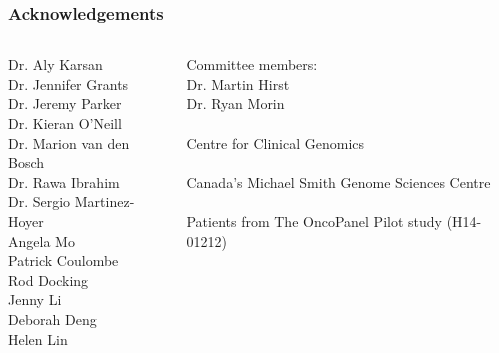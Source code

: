 \documentclass{beamer}
\begin{document}

\begin{frame}
\frametitle{Acknowledgements}
\begin{columns}[T] %
\begin{column}{.48\textwidth}
Dr. Aly Karsan \\
Dr. Jennifer Grants \\
Dr. Jeremy Parker \\
Dr. Kieran O'Neill \\
Dr. Marion van den Bosch \\
Dr. Rawa Ibrahim \\
Dr. Sergio Martinez-Hoyer \\
Angela Mo \\
Patrick Coulombe \\
Rod Docking \\
Jenny Li \\
Deborah Deng \\
Helen Lin
\end{column}%
\hfill%
\begin{column}{.48\textwidth}
Committee members: \\
Dr. Martin Hirst \\
Dr. Ryan Morin
\\~\\
Centre for Clinical Genomics
\\~\\
Canada's Michael Smith Genome Sciences Centre
\\~\\
Patients from The OncoPanel Pilot study (H14-01212)
\end{column}%
\end{columns}
\end{frame}
\end{document}
